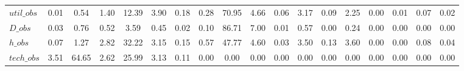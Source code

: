 \begin{center}
\begin{longtable}{lccccccccccccccccc}
$util\_obs      $	 & 	            0.01	 & 	            0.54	 & 	            1.40	 & 	           12.39	 & 	            3.90	 & 	            0.18	 & 	            0.28	 & 	           70.95	 & 	            4.66	 & 	            0.06	 & 	            3.17	 & 	            0.09	 & 	            2.25	 & 	            0.00	 & 	            0.01	 & 	            0.07	 & 	            0.02 \\ 
$D\_obs         $	 & 	            0.03	 & 	            0.76	 & 	            0.52	 & 	            3.59	 & 	            0.45	 & 	            0.02	 & 	            0.10	 & 	           86.71	 & 	            7.00	 & 	            0.01	 & 	            0.57	 & 	            0.00	 & 	            0.24	 & 	            0.00	 & 	            0.00	 & 	            0.00	 & 	            0.00 \\ 
$h\_obs         $	 & 	            0.07	 & 	            1.27	 & 	            2.82	 & 	           32.22	 & 	            3.15	 & 	            0.15	 & 	            0.57	 & 	           47.77	 & 	            4.60	 & 	            0.03	 & 	            3.50	 & 	            0.13	 & 	            3.60	 & 	            0.00	 & 	            0.00	 & 	            0.08	 & 	            0.04 \\ 
$tech\_obs      $	 & 	            3.51	 & 	           64.65	 & 	            2.62	 & 	           25.99	 & 	            3.13	 & 	            0.11	 & 	            0.00	 & 	            0.00	 & 	            0.00	 & 	            0.00	 & 	            0.00	 & 	            0.00	 & 	            0.00	 & 	            0.00	 & 	            0.00	 & 	            0.00	 & 	            0.00 \\ 
\end{longtable}
 \end{center}
